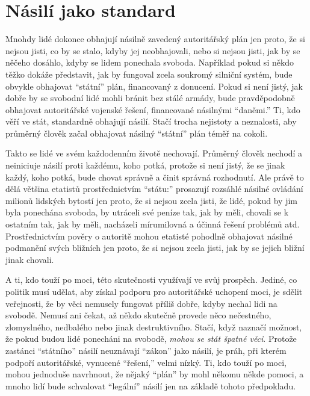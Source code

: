 \documentclass{book}
\begin{document}
\section{Násilí jako standard}

Mnohdy lidé dokonce obhajují násilně zavedený autoritářský plán jen proto, že si nejsou jisti, co by se stalo, kdyby jej neobhajovali, nebo si nejsou jisti, jak by se něčeho dosáhlo, kdyby se lidem ponechala svoboda. Například pokud si někdo těžko dokáže představit, jak by fungoval zcela soukromý silniční systém, bude obvykle obhajovat \enquote{státní} plán, financovaný z donucení. Pokud si není jistý, jak dobře by se svobodní lidé mohli bránit bez stálé armády, bude pravděpodobně obhajovat autoritářské vojenské řešení, financované násilnými \enquote{daněmi.} Ti, kdo věří ve stát, standardně obhajují násilí. Stačí trocha nejistoty a neznalosti, aby průměrný člověk začal obhajovat násilný \enquote{státní} plán téměř na cokoli.

Takto se lidé ve svém každodenním životě nechovají. Průměrný člověk nechodí a neiniciuje násilí proti každému, koho potká, protože si není jistý, že se jinak každý, koho potká, bude chovat správně a činit správná rozhodnutí. Ale právě to dělá většina etatistů prostřednictvím \enquote{státu:} prosazují rozsáhlé násilné ovládání milionů lidských bytostí jen proto, že si nejsou zcela jisti, že lidé, pokud by jim byla ponechána svoboda, by utráceli své peníze tak, jak by měli, chovali se k ostatním tak, jak by měli, nacházeli mírumilovná a účinná řešení problémů atd. Prostřednictvím pověry o autoritě mohou etatisté pohodlně obhajovat násilné podmanění svých bližních jen proto, že si nejsou zcela jisti, jak by se jejich bližní jinak chovali.

A ti, kdo touží po moci, této skutečnosti využívají ve svůj prospěch. Jediné, co politik musí udělat, aby získal podporu pro autoritářské uchopení moci, je sdělit veřejnosti, že by věci nemusely fungovat příliš dobře, kdyby nechal lidi na svobodě. Nemusí ani čekat, až někdo skutečně provede něco nečestného, zlomyslného, nedbalého nebo jinak destruktivního. Stačí, když naznačí možnost, že pokud budou lidé ponecháni na svobodě, \emph{mohou se stát špatné věci}. Protože zastánci \enquote{státního} násilí neuznávají \enquote{zákon} jako násilí, je práh, při kterém podpoří autoritářské, vynucené \enquote{řešení,} velmi nízký. Ti, kdo touží po moci, mohou jednoduše navrhnout, že nějaký \enquote{plán} by mohl někomu někde pomoci, a mnoho lidí bude schvalovat \enquote{legální} násilí jen na základě tohoto předpokladu.
\end{document}
